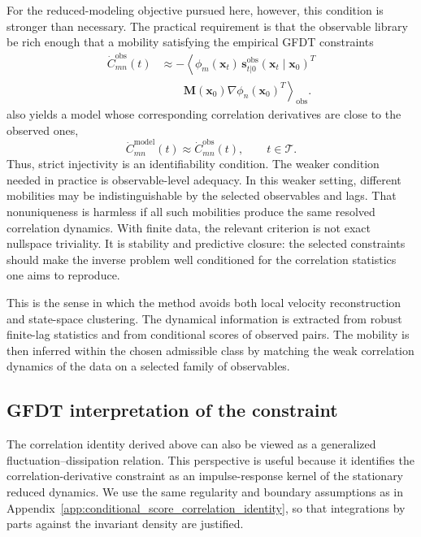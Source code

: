 \documentclass[11pt,twoside,fleqn]{article}
\begin{document}
For the reduced-modeling objective pursued here, however, this condition is
stronger than necessary. The practical requirement is that the observable
library be rich enough that a mobility satisfying the empirical GFDT constraints
\begin{equation}
\begin{aligned}
    \dot C_{mn}^{\mathrm{obs}}(t)
    &\approx
    -
    \left\langle
        \phi_m(\bm{x}_t)\,
        \bm{s}_{t|0}^{\mathrm{obs}}(\bm{x}_t\mid\bm{x}_0)^T
    \right. \\
    &\qquad\left.
        \bm{M}(\bm{x}_0)
        \nabla\phi_n(\bm{x}_0)^T
    \right\rangle_{\mathrm{obs}} .
\end{aligned}
    \label{eq:weak_observable_adequacy}
\end{equation}
also yields a model whose corresponding correlation derivatives are close to
the observed ones,
\begin{equation}
    \dot C_{mn}^{\mathrm{model}}(t)
    \approx
    \dot C_{mn}^{\mathrm{obs}}(t),
    \qquad
    t\in\mathcal{T}.
    \label{eq:model_correlation_derivative_adequacy}
\end{equation}
Thus, strict injectivity is an identifiability condition. The weaker condition
needed in practice is observable-level adequacy. In this weaker setting,
different mobilities may be indistinguishable by the selected observables and
lags. That nonuniqueness is harmless if all such mobilities produce the same
resolved correlation dynamics. With finite data, the relevant criterion is not
exact nullspace triviality. It is stability and predictive closure: the
selected constraints should make the inverse problem well conditioned for the
correlation statistics one aims to reproduce.

This is the sense in which the method avoids both local velocity reconstruction
and state-space clustering. The dynamical information is extracted from robust
finite-lag statistics and from conditional scores of observed pairs. The
mobility is then inferred within the chosen admissible class by matching the
weak correlation dynamics of the data on a selected family of observables.

\subsection{GFDT interpretation of the constraint}
\label{subsec:gfdt_interpretation_correlation_constraint}

The correlation identity derived above can also be viewed as a generalized
fluctuation--dissipation relation. This perspective is useful because it
identifies the correlation-derivative constraint as an impulse-response kernel
of the stationary reduced dynamics. We use the same regularity and boundary
assumptions as in Appendix~\ref{app:conditional_score_correlation_identity}, so
that integrations by parts against the invariant density are justified.
\end{document}

